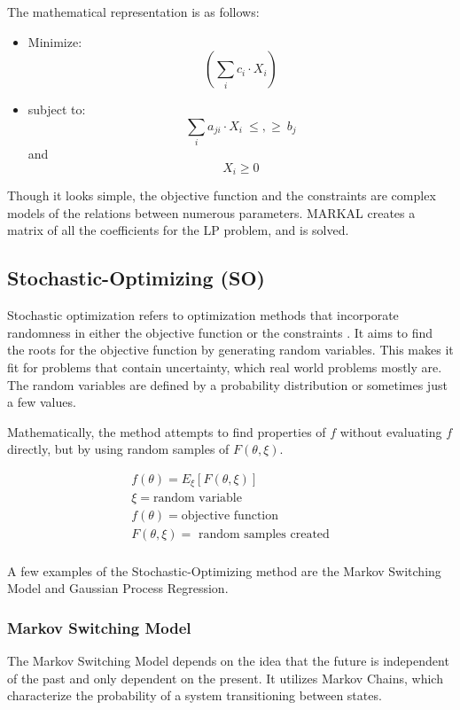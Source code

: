 The mathematical representation is as follows:

\begin{itemize}
	\item[] Minimize:
	\[(\sum_i c_i \cdot X_i) \]
	\item[]subject to:
	\[ \sum_i a_{ji} \cdot X_i \ \leq , \geq \  b_j \] \quad \textrm{and} \quad \[ 	X_i \geq 0 \]
	
\end{itemize}
	
	

Though it looks simple, the objective function and the
constraints are complex models of the relations between
numerous parameters. \gls{MARKAL} creates a matrix
of all the coefficients for the \gls{LP} problem, and is
solved. 


\subsection{Stochastic-Optimizing (SO)}
Stochastic optimization refers to optimization methods
that incorporate randomness in either the objective function
or the constraints \cite{lauren_stochastic_2015}. It aims to find
the roots for the objective function by generating random variables.
This makes it fit for problems that contain uncertainty, which
real world problems mostly are. 
The random variables are defined by a probability distribution
or sometimes just a few values.

Mathematically, the method attempts to find properties of $f$ without
evaluating $f$ directly, but by using random samples of $F(\theta, \xi).$

\begin{align}
	f(\theta)= E_{\xi} [F(\theta, \xi)] \\
	\xi = \mbox{random variable} \\
	f(\theta) = \mbox{objective function} \\
	F(\theta,\xi) = \mbox{ random samples created} \\
\end{align}

A few examples of the Stochastic-Optimizing method are
the Markov Switching Model and Gaussian Process Regression.


\subsubsection{Markov Switching Model}
The Markov Switching Model depends on the idea that
the future is independent of the past and only dependent
on the present. It utilizes Markov Chains, which 
characterize the probability of a system transitioning
between states.

